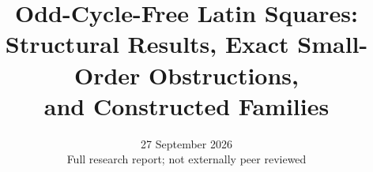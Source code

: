 \documentclass[11pt]{article}
\title{Odd-Cycle-Free Latin Squares:\\
Structural Results, Exact Small-Order Obstructions,\\
and Constructed Families}
\author{}
\date{27 September 2026\\\small Full research report; not externally peer reviewed}
\begin{document}
\maketitle


\tableofcontents



















\footnotesize


\end{document}
